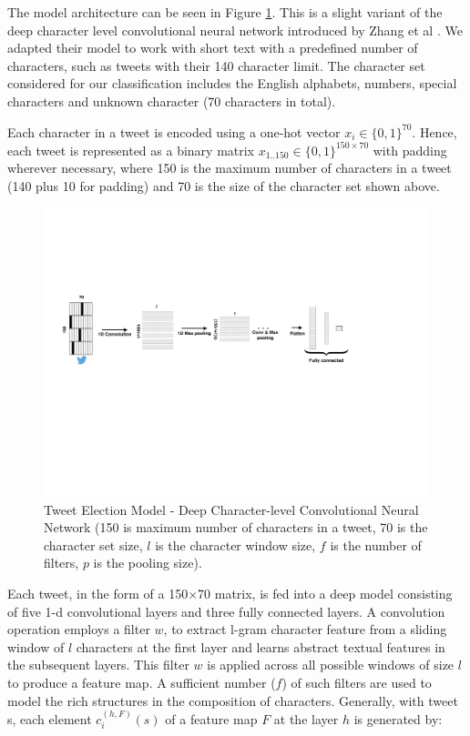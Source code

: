 \documentclass[letterpaper]{article}
\begin{document}
The model architecture can be seen in Figure \ref{cnn_elect}. This is a slight variant of the deep character level convolutional neural network introduced by Zhang et al \cite{zhang2015text}. We adapted their model to work with short text with a predefined number of characters, such as tweets with their 140 character limit. The character set considered for our classification includes the English alphabets, numbers, special characters and unknown character (70 characters in total). %


Each character in a tweet is encoded using a one-hot vector $x_i\in\{0,1\}^{70}$. Hence, each tweet is represented as a binary matrix $x_{1..150}\in\{0,1\}^{150\times70}$ with padding wherever necessary, where 150 is the maximum number of characters in a tweet (140 plus 10 for padding) and 70 is the size of the character set shown above.
\begin{figure}[]
\includegraphics[width=\columnwidth]{cnn_char.pdf} %
\caption{Tweet Election Model -  Deep Character-level Convolutional Neural Network (150 is maximum number of characters in a tweet, 70 is the character set size, $l$ is the character window size,  $f$ is the number of filters, $p$ is the pooling size).}
\label{cnn_elect}
\end{figure}
Each tweet, in the form of a 150$\times$70 matrix, is fed into a deep model consisting of five 1-d convolutional layers and three fully connected layers. A convolution operation employs a filter $w$, to extract l-gram character feature from a sliding window of $l$ characters at the first layer and learns abstract textual features in the subsequent layers. This filter $w$ is applied across all possible windows of size $l$ to produce a feature map. A sufficient number ($f$) of such filters are used to model the rich structures in the composition of characters. Generally, with tweet s, each element $c_i^{(h,F)}(s)$ of a feature map $F$ at the layer $h$ is generated by:
\end{document}
